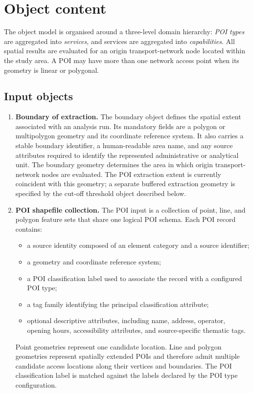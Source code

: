 \section{Object content}

The object model is organised around a three-level domain hierarchy:
\emph{POI types} are aggregated into \emph{services}, and services are
aggregated into \emph{capabilities}. All spatial results are evaluated for an
origin transport-network node located within the study area. A POI may have
more than one network access point when its geometry is linear or polygonal.

\subsection*{Input objects}
\begin{enumerate}
    \item \textbf{Boundary of extraction.}
    The boundary object defines the spatial extent associated with an analysis
    run. Its mandatory fields are a polygon or multipolygon geometry and its
    coordinate reference system. It also carries a stable boundary identifier,
    a human-readable area name, and any source attributes required to identify
    the represented administrative or analytical unit. The boundary geometry
    determines the area in which origin transport-network nodes are evaluated.
    The POI extraction extent is currently coincident with this geometry; a
    separate buffered extraction geometry is specified by the cut-off threshold
    object described below.

    \item \textbf{POI shapefile collection.}
    The POI input is a collection of point, line, and polygon feature sets that
    share one logical POI schema. Each POI record contains:
    \begin{itemize}
        \item a source identity composed of an element category and a source
        identifier;
        \item a geometry and coordinate reference system;
        \item a POI classification label used to associate the record with a
        configured POI type;
        \item a tag family identifying the principal classification attribute;
        \item optional descriptive attributes, including name, address,
        operator, opening hours, accessibility attributes, and source-specific
        thematic tags.
    \end{itemize}
    Point geometries represent one candidate location. Line and polygon
    geometries represent spatially extended POIs and therefore admit multiple
    candidate access locations along their vertices and boundaries. The POI
    classification label is matched against the labels declared by the POI type
    configuration.


\end{enumerate}
